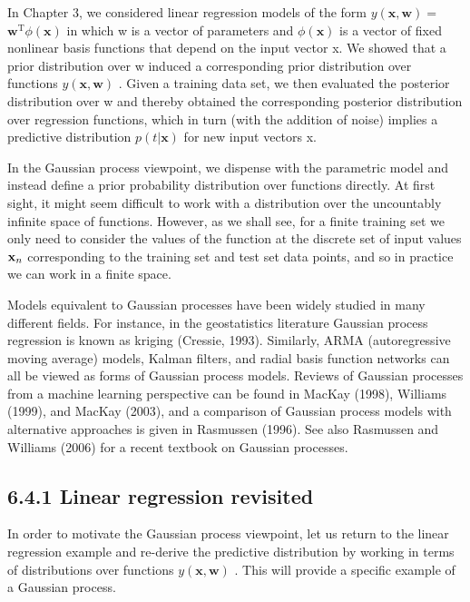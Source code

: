 \documentclass[
  10
]{article}
\begin{document}
In Chapter 3, we considered linear regression models of the form
\(y ( \mathbf { x } , \mathbf { w } ) =\)
\(\mathbf { w } ^ { \mathrm { T } } \phi ( \mathbf { x } )\) in which w
is a vector of parameters and \(\phi ( \mathbf { x } )\) is a vector of
fixed nonlinear basis functions that depend on the input vector x. We
showed that a prior distribution over w induced a corresponding prior
distribution over functions \(y ( \mathbf { x } , \mathbf { w } )\) .
Given a training data set, we then evaluated the posterior distribution
over w and thereby obtained the corresponding posterior distribution
over regression functions, which in turn (with the addition of noise)
implies a predictive distribution \(p ( t | \mathbf { x } )\) for new
input vectors x.

In the Gaussian process viewpoint, we dispense with the parametric model
and instead define a prior probability distribution over functions
directly. At first sight, it might seem difficult to work with a
distribution over the uncountably infinite space of functions. However,
as we shall see, for a finite training set we only need to consider the
values of the function at the discrete set of input values
\({ \bf x } _ { n }\) corresponding to the training set and test set
data points, and so in practice we can work in a finite space.

Models equivalent to Gaussian processes have been widely studied in many
different fields. For instance, in the geostatistics literature Gaussian
process regression is known as kriging (Cressie, 1993). Similarly, ARMA
(autoregressive moving average) models, Kalman filters, and radial basis
function networks can all be viewed as forms of Gaussian process models.
Reviews of Gaussian processes from a machine learning perspective can be
found in MacKay (1998), Williams (1999), and MacKay (2003), and a
comparison of Gaussian process models with alternative approaches is
given in Rasmussen (1996). See also Rasmussen and Williams (2006) for a
recent textbook on Gaussian processes.

\subsection{6.4.1 Linear regression
revisited}\label{linear-regression-revisited}

In order to motivate the Gaussian process viewpoint, let us return to
the linear regression example and re-derive the predictive distribution
by working in terms of distributions over functions
\(y ( \mathbf { x } , \mathbf { w } )\) . This will provide a specific
example of a Gaussian process.
\end{document}
